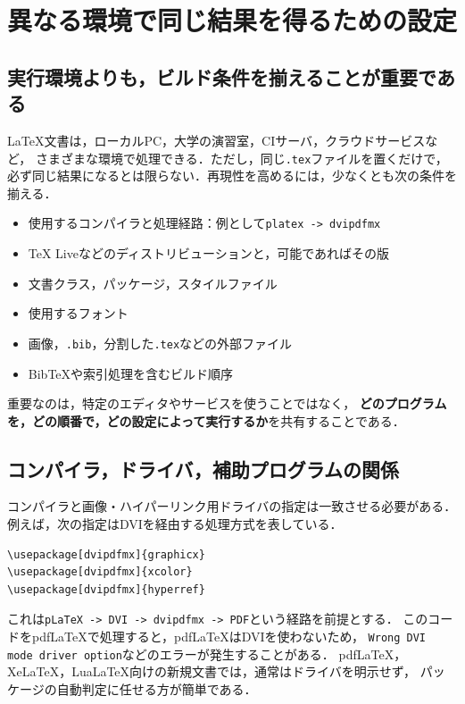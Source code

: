 \documentclass[a4paper,11pt]{jsarticle}
\newcommand{\code}[1]{\texttt{#1}}
\begin{document}
\clearpage
\section{異なる環境で同じ結果を得るための設定}

\subsection{実行環境よりも，ビルド条件を揃えることが重要である}

LaTeX文書は，ローカルPC，大学の演習室，CIサーバ，クラウドサービスなど，
さまざまな環境で処理できる．ただし，同じ\code{.tex}ファイルを置くだけで，
必ず同じ結果になるとは限らない．再現性を高めるには，少なくとも次の条件を揃える．

\begin{itemize}
  \item 使用するコンパイラと処理経路：例として\code{platex -> dvipdfmx}
  \item TeX Liveなどのディストリビューションと，可能であればその版
  \item 文書クラス，パッケージ，スタイルファイル
  \item 使用するフォント
  \item 画像，\code{.bib}，分割した\code{.tex}などの外部ファイル
  \item BibTeXや索引処理を含むビルド順序
\end{itemize}

重要なのは，特定のエディタやサービスを使うことではなく，
\textbf{どのプログラムを，どの順番で，どの設定によって実行するか}を共有することである\cite{latexmk,overleaf-latexmkrc}．

\subsection{コンパイラ，ドライバ，補助プログラムの関係}

コンパイラと画像・ハイパーリンク用ドライバの指定は一致させる必要がある．
例えば，次の指定はDVIを経由する処理方式を表している．

\begin{lstlisting}[language={[LaTeX]TeX}]
\usepackage[dvipdfmx]{graphicx}
\usepackage[dvipdfmx]{xcolor}
\usepackage[dvipdfmx]{hyperref}
\end{lstlisting}

これは\code{pLaTeX -> DVI -> dvipdfmx -> PDF}という経路を前提とする．
このコードをpdfLaTeXで処理すると，pdfLaTeXはDVIを使わないため，
\code{Wrong DVI mode driver option}などのエラーが発生することがある．
pdfLaTeX，XeLaTeX，LuaLaTeX向けの新規文書では，通常はドライバを明示せず，
パッケージの自動判定に任せる方が簡単である．
\end{document}
